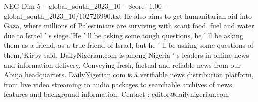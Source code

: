 \begin{textsample}{NEG Dim 5 – global\_south\_2023\_10 – Score -1.00 – global\_south\_2023\_10/102726990.txt}
He also aims to get humanitarian aid into Gaza, where millions of Palestinians are surviving with scant food, fuel and water due to Israel ' s siege."He ' ll be asking some tough questions, he ' ll be asking them as a friend, as a true friend of Israel, but he ' ll be asking some questions of them,"Kirby said.
DailyNigerian.com is among Nigeria ' s leaders in online news and information delivery.
Conveying fresh, factual and reliable news from our Abuja headquarters.
DailyNigerian.com is a verifiable news distribution platform, from live video streaming to audio packages to searchable archives of news features and background information.
Contact : editor@dailynigerian.com

\end{textsample}
